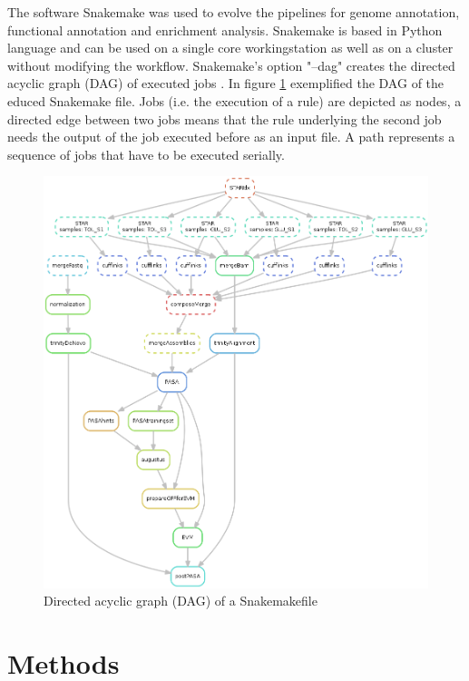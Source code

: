 \documentclass[12pt, a4paper]{report}
\begin{document}
The software Snakemake was used to evolve the pipelines for genome annotation, functional annotation and enrichment analysis. Snakemake is based in Python language and can be used on a single core workingstation as well as on a cluster without modifying the workflow. 
Snakemake's option "--dag" creates the directed acyclic graph (DAG) of executed jobs \cite{Koster2012}.   
\newline
In figure \ref{fig:DAG} exemplified the DAG of the educed Snakemake file. Jobs (i.e. the execution of a rule) are depicted as nodes, a directed edge between two jobs means that the rule underlying the second job needs the output of the job executed before as an input file. A path represents a sequence of jobs that have to be executed serially.
\begin{figure}[H]
	\centering	
	\includegraphics[width=430pt]{pics/DAG.png}
	\caption[Directed acyclic graph (DAG)]
	{Directed acyclic graph (DAG) of a Snakemakefile}
	\label{fig:DAG}
\end{figure}

\newpage
\setcounter{chapter}{2}\setcounter{section}{0}
\chapter*{Methods}
\end{document}
